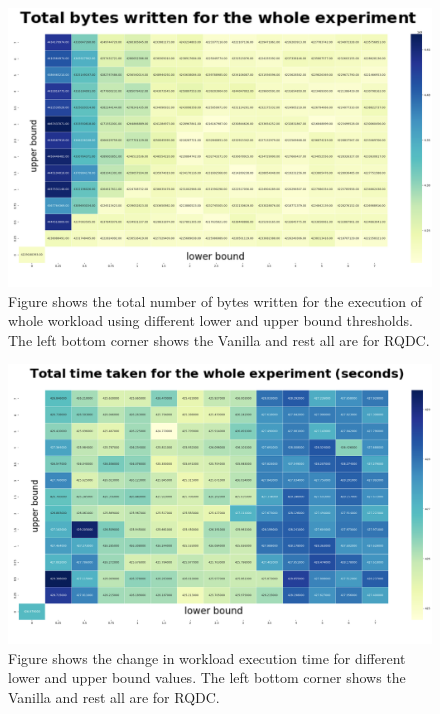 \begin{figure}
    \includegraphics[width=\linewidth]{Figures/total_bytes_written.png}
    \caption{Figure shows the total number of bytes written for the execution of whole workload using different lower 
    and upper bound thresholds. The left bottom corner shows the Vanilla and rest all are for RQDC.}
\end{figure}

\begin{figure}
    \includegraphics[width=\linewidth]{Figures/total_time_taken.png}
    \caption{Figure shows the change in workload execution time for different lower and upper bound values. The left 
    bottom corner shows the Vanilla and rest all are for RQDC.}
\end{figure}

